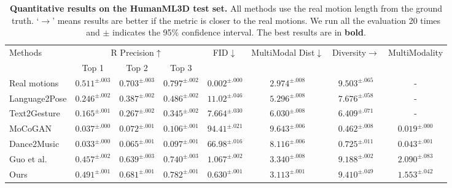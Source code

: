 \begin{table*}[ht]
\centering
\caption{\textbf{Quantitative results on the HumanML3D test set.} All methods use the real motion length from the ground truth. `$\rightarrow$' means results are better if the metric is closer to the real motions. We run all the evaluation 20 times and $\pm$ indicates the 95\% confidence interval. The best results are in \textbf{bold}.}
\label{tab:humanml3d}
\setlength{\tabcolsep}{1.4mm}
{
\begin{tabular}{lccccccc}
\hline

\multirow{2}{2cm}{\centering Methods} & \multicolumn{3}{c}{\centering R Precision$\uparrow$} & \multirow{2}{1.5cm}{\centering FID$\downarrow$} & \multirow{2}{2.5cm}{\centering MultiModal Dist$\downarrow$} & \multirow{2}{2cm}{\centering Diversity$\rightarrow$} & \multirow{2}{2cm}{\centering MultiModality} \\
& Top 1 & Top 2 & Top 3 \\
\hline
Real motions & $0.511^{\pm .003}$ & $0.703^{\pm.003}$ & $0.797^{\pm.002}$ & $0.002^{\pm.000}$ & $2.974^{\pm.008}$ & $9.503^{\pm.065}$ & -\\ 
\hline

Language2Pose & $0.246^{\pm.002}$ & $0.387^{\pm.002}$ & $0.486^{\pm.002}$ & $11.02^{\pm.046}$ & $5.296^{\pm.008}$ & $7.676^{\pm.058}$ & - \\

Text2Gesture & $0.165^{\pm.001}$ & $0.267^{\pm.002}$ & $0.345^{\pm.002}$ & $7.664^{\pm.030}$ & $6.030^{\pm.008}$ & $6.409^{\pm.071}$ & - \\

MoCoGAN & $0.037^{\pm.000}$ & $0.072^{\pm.001}$ & $0.106^{\pm.001}$ & $94.41^{\pm.021}$ & $9.643^{\pm.006}$ & $0.462^{\pm.008}$ &
$0.019^{\pm.000}$ \\

Dance2Music & $0.033^{\pm.000}$ & $0.065^{\pm.001}$ & $0.097^{\pm.001}$ & $66.98^{\pm.016}$ & $8.116^{\pm.006}$ & $0.725^{\pm.011}$ & $0.043^{\pm.001}$ \\

Guo et al. & $0.457^{\pm.002}$ & $0.639^{\pm.003}$ & $0.740^{\pm.003}$ & $1.067^{\pm.002}$ & $3.340^{\pm.008}$ & $9.188^{\pm.002}$ & $2.090^{\pm.083}$ \\
\hline
Ours & $\mathbf{0.491^{\pm.001}}$ & $\mathbf{0.681^{\pm.001}}$ & $\mathbf{0.782^{\pm.001}}$ & $\mathbf{0.630^{\pm.001}}$ & $\mathbf{3.113^{\pm.001}}$ & $\mathbf{9.410^{\pm.049}}$ & $1.553^{\pm.042}$ \\
\hline
\end{tabular}}
\end{table*}

